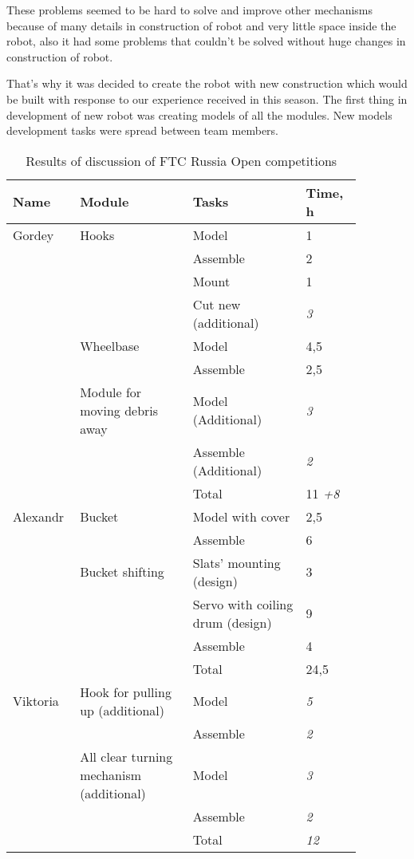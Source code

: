 These problems seemed to be hard to solve and improve other mechanisms because of many details in construction of robot and very little space inside the robot, also it had some problems that couldn't be solved without huge changes in construction of robot. 

That’s why it was decided to create the robot with new construction which would be built with response to our experience received in this season. The first thing in development of new robot was creating models of all the modules. New models development tasks were spread between team members.

\begin{table}[H]
	\caption{Results of discussion of FTC Russia Open competitions}
	\label{tabular:PlanRUS28.02}
	\begin{center}
		\begin{tabular}{|p{0.12\linewidth}|p{0.3\linewidth}|p{0.3\linewidth}|p{0.15\linewidth}|}
			\hline
			Name & Module & Tasks & Time, h \\
			\hline
			\hline
			
			Gordey	& Hooks	& Model	& 1 \\
			& & Assemble & 2 \\
			& & Mount & 1 \\
			& & Cut new (additional) & \textit{3} \\
			\hline
			& Wheelbase & Model & 4,5 \\
			& & Assemble	& 2,5 \\
			& Module for moving debris away	& Model (Additional)	& \textit{3} \\
			& & Assemble (Additional) & \textit{2} \\
			\hline
			& & Total & 11 \textit{+8} \\
			\hline 
			\hline
			
			Alexandr & Bucket	& Model with cover	& 2,5 \\
									& & Assemble & 6 \\
			\hline
				  & Bucket shifting & Slats' mounting (design) & 3 \\
									& & Servo with coiling drum (design)	& 9 \\   
									& & Assemble	& 4 \\   
			\hline                                
			& & Total	& 24,5 \\                             
			\hline
			\hline 
			
			Viktoria & Hook for pulling up (additional)	& Model	& \textit{5} \\              
													& & Assemble	& \textit{2}\\   
			\hline       
					  & All clear turning mechanism (additional) & Model & \textit{3}\\       
															 	& & Assemble	& \textit{2} \\
			\hline                                
			& & Total	& \textit{12}\\                        
			\hline
			\hline                    
			                        

\end{tabular}
\end{center}
\end{table}
